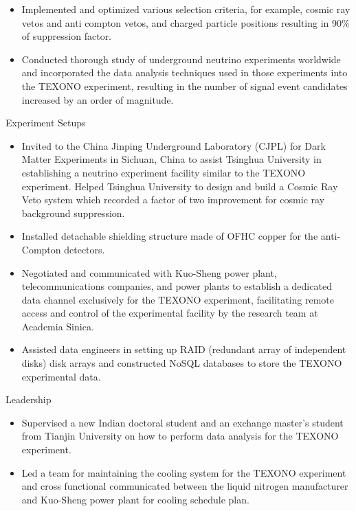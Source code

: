 \documentclass[margin, 10pt]{res} %
\begin{document}
\begin{resume}
\begin{itemize}
    \item Implemented and optimized various selection criteria, for example, cosmic ray vetos and anti compton vetos, and charged particle positions resulting in 90\% of suppression factor.
    \item Conducted thorough study of underground neutrino experiments worldwide and incorporated the data analysis techniques used in those experiments into the TEXONO experiment, resulting in the number of signal event candidates increased by an order of magnitude.
\end{itemize}
\textrm{Experiment Setups}
\begin{itemize}
    \item Invited to the China Jinping Underground Laboratory (CJPL) for Dark Matter Experiments in Sichuan, China to assist Tsinghua University in establishing a neutrino experiment facility similar to the TEXONO experiment. Helped Tsinghua University to design and build a Cosmic Ray Veto system which recorded a factor of two improvement for cosmic ray background suppression.
    \item Installed detachable shielding structure made of OFHC copper for the anti-Compton detectors.
    \item Negotiated and communicated with Kuo-Sheng power plant, telecommunications companies, and power plants to establish a dedicated data channel exclusively for the TEXONO experiment, facilitating remote access and control of the experimental facility by the research team at Academia Sinica.
    \item Assisted data engineers in setting up RAID (redundant array of independent disks) disk arrays and constructed NoSQL databases to store the TEXONO experimental data.
\end{itemize}
\textrm{Leadership}
\begin{itemize}
    \item Supervised a new Indian doctoral student and an exchange master's student from Tianjin University on how to perform data analysis for the TEXONO experiment.
    \item Led a team for maintaining the cooling system for the TEXONO experiment and cross functional communicated between the liquid nitrogen manufacturer and Kuo-Sheng power plant for cooling schedule plan.
\end{itemize}



\end{resume}
\end{document}
